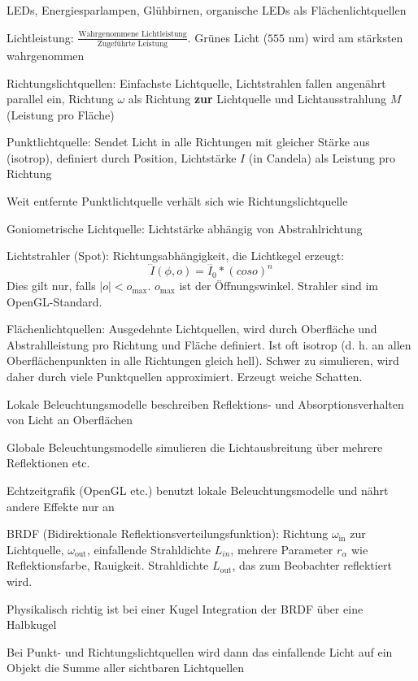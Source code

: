 \documentclass[12pt,landscape]{article}
\begin{document}
\begin{multicols}{3}
\begin{compactitem}
\item LEDs, Energiesparlampen, Glühbirnen, organische LEDs als Flächenlichtquellen
\item Lichtleistung: $\frac{\text{Wahrgenommene Lichtleistung}}{\text{Zugeführte Leistung}}$. Grünes Licht ($555$ nm) wird am stärksten wahrgenommen
\item Richtungslichtquellen: Einfachste Lichtquelle, Lichtstrahlen fallen angenährt parallel ein, Richtung $\omega$ als Richtung \textbf{zur} Lichtquelle und Lichtausstrahlung $M$ (Leistung pro Fläche)
\item Punktlichtquelle: Sendet Licht in alle Richtungen mit gleicher Stärke aus (isotrop), definiert durch Position, Lichtstärke $I$ (in Candela) als Leistung pro Richtung 
\item Weit entfernte Punktlichtquelle verhält sich wie Richtungslichtquelle
\item Goniometrische Lichtquelle: Lichtstärke abhängig von Abstrahlrichtung
\item Lichtstrahler (Spot): Richtungsabhängigkeit, die Lichtkegel erzeugt: \[
\dddot{I}(\phi, o) = \dddot{I_0} * (cos o)^n
\]
Dies gilt nur, falls $|o| < o_{\max}$. $o_{\max}$ ist der Öffnungswinkel. Strahler sind im OpenGL-Standard.
\item Flächenlichtquellen: Ausgedehnte Lichtquellen, wird durch Oberfläche und Abstrahlleistung pro Richtung und Fläche definiert. Ist oft isotrop (d. h. an allen Oberflächenpunkten in alle Richtungen gleich hell). Schwer zu simulieren, wird daher durch viele Punktquellen approximiert. Erzeugt weiche Schatten.
\item Lokale Beleuchtungsmodelle beschreiben Reflektions- und Absorptionsverhalten von Licht an Oberflächen
\item Globale Beleuchtungsmodelle simulieren die Lichtausbreitung über mehrere Reflektionen etc.
\item Echtzeitgrafik (OpenGL etc.) benutzt lokale Beleuchtungsmodelle und nährt andere Effekte nur an
\item BRDF (Bidirektionale Reflektionsverteilungsfunktion): Richtung $\omega_{\text{in}}$ zur Lichtquelle, $\omega_{\text{out}}$, einfallende Strahldichte $L_{in}$, mehrere Parameter $r_{\alpha}$ wie Reflektionsfarbe, Rauigkeit. Strahldichte $L_{\text{out}}$, das zum Beobachter reflektiert wird.
\item Physikalisch richtig ist bei einer Kugel Integration der BRDF über eine Halbkugel 
\item Bei Punkt- und Richtungslichtquellen wird dann das einfallende Licht auf ein Objekt die Summe aller sichtbaren Lichtquellen

\end{compactitem}
\end{multicols}
\end{document}
